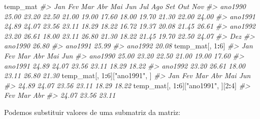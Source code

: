 \documentclass[]{book}
\newenvironment{Shaded}{\begin{snugshade}}{\end{snugshade}}
\newcommand{\DecValTok}[1]{\textcolor[rgb]{0.00,0.00,0.81}{#1}}
\newcommand{\StringTok}[1]{\textcolor[rgb]{0.31,0.60,0.02}{#1}}
\newcommand{\CommentTok}[1]{\textcolor[rgb]{0.56,0.35,0.01}{\textit{#1}}}
\newcommand{\OperatorTok}[1]{\textcolor[rgb]{0.81,0.36,0.00}{\textbf{#1}}}
\newcommand{\NormalTok}[1]{#1}
\begin{document}
\begin{Shaded}
\begin{Highlighting}[]
\NormalTok{temp_mat}
\CommentTok{#>           Jan   Fev   Mar   Abr   Mai   Jun   Jul   Ago   Set   Out   Nov}
\CommentTok{#> ano1990 25.00 23.20 22.50 21.00 19.00 17.60 18.00 19.70 21.30 22.00 24.00}
\CommentTok{#> ano1991 24.89 24.07 23.56 23.11 18.29 18.22 16.72 19.37 20.08 21.45 26.61}
\CommentTok{#> ano1992 23.20 26.61 18.00 23.11 26.80 21.30 18.22 21.45 19.70 22.50 24.07}
\CommentTok{#>           Dez}
\CommentTok{#> ano1990 26.80}
\CommentTok{#> ano1991 25.99}
\CommentTok{#> ano1992 20.08}
\NormalTok{temp_mat[, }\DecValTok{1}\OperatorTok{:}\DecValTok{6}\NormalTok{]}
\CommentTok{#>           Jan   Fev   Mar   Abr   Mai   Jun}
\CommentTok{#> ano1990 25.00 23.20 22.50 21.00 19.00 17.60}
\CommentTok{#> ano1991 24.89 24.07 23.56 23.11 18.29 18.22}
\CommentTok{#> ano1992 23.20 26.61 18.00 23.11 26.80 21.30}
\NormalTok{temp_mat[, }\DecValTok{1}\OperatorTok{:}\DecValTok{6}\NormalTok{][}\StringTok{"ano1991"}\NormalTok{, ]}
\CommentTok{#>   Jan   Fev   Mar   Abr   Mai   Jun }
\CommentTok{#> 24.89 24.07 23.56 23.11 18.29 18.22}
\NormalTok{temp_mat[, }\DecValTok{1}\OperatorTok{:}\DecValTok{6}\NormalTok{][}\StringTok{"ano1991"}\NormalTok{, ][}\DecValTok{2}\OperatorTok{:}\DecValTok{4}\NormalTok{]}
\CommentTok{#>   Fev   Mar   Abr }
\CommentTok{#> 24.07 23.56 23.11}
\end{Highlighting}
\end{Shaded}

Podemos substituir valores de uma submatriz da matriz:
\end{document}
